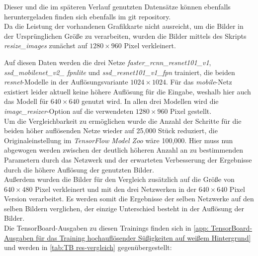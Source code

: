 \documentclass[12pt, oneside]{article}
\begin{document}
Dieser und die im späteren Verlauf genutzten Datensätze können ebenfalls heruntergeladen finden sich ebenfalls im git repository.\\

Da die Leistung der vorhandenen Grafikkarte nicht ausreicht, um die Bilder in der Ursprünglichen Größe zu verarbeiten, wurden die Bilder mittels des Skripts \textit{resize\_images} zunächst auf $1280\times960$ Pixel verkleinert.

Auf diesen Daten werden die drei Netze \textit{faster\_rcnn\_resnet101\_v1}, \textit{ssd\_mobilenet\_v2\_ fpnlite} und \textit{ssd\_resnet101\_v1\_fpn} trainiert, die beiden \textit{resnet}-Modelle in der Auflösungsvariante $1024\times1024$. Für das \textit{mobile}-Netz existiert leider aktuell keine höhere Auflösung für die Eingabe, weshalb hier auch das Modell für $640\times640$ genutzt wird. In allen drei Modellen wird die \textit{image\_resizer}-Option auf die verwendeten $1280\times960$ Pixel gestellt.\\

Um die Vergleichbarkeit zu ermöglichen wurde die Anzahl der Schritte für die beiden höher auflösenden Netze wieder auf 25,000 Stück reduziert, die Originaleinstellung im \textit{TensorFlow Model Zoo} wäre 100,000. Hier muss nun abgewogen werden zwischen der deutlich höheren Anzahl an zu bestimmenden Parametern durch das Netzwerk und der erwarteten Verbesserung der Ergebnisse durch die höhere Auflösung der genutzten Bilder.\\

Außerdem wurden die Bilder für den Vergleich zusätzlich auf die Größe von $640\times480$ Pixel verkleinert und mit den drei Netzwerken in der $640\times640$ Pixel Version verarbeitet. Es werden somit die Ergebnisse der selben Netzwerke auf den selben Bildern verglichen, der einzige Unterschied besteht in der Auflösung der Bilder.\\

Die TensorBoard-Ausgaben zu diesen Trainings finden sich in \autoref{app: TensorBoard-Ausgaben für das Training hochauflösender Süßigkeiten auf weißem Hintergrund} und werden in \autoref{tab:TB res-vergleich} gegenübergestellt:
\end{document}
